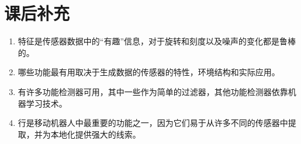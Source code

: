 \section*{课后补充}
\begin{enumerate}

\item 特征是传感器数据中的“有趣”信息，对于旋转和刻度以及噪声的变化都是鲁棒的。
\item 哪些功能最有用取决于生成数据的传感器的特性，环境结构和实际应用。
\item 有许多功能检测器可用，其中一些作为简单的过滤器，其他功能检测器依靠机器学习技术。
\item 行是移动机器人中最重要的功能之一，因为它们易于从许多不同的传感器中提取，并为本地化提供强大的线索。
\end{enumerate}

